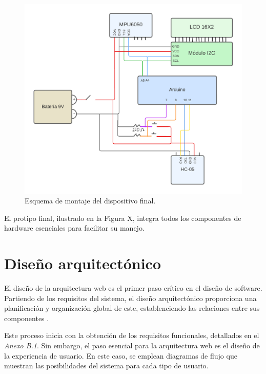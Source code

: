 \begin{figure}[h]
    \centering
    \includegraphics[width=1\textwidth]{img/E1_Planos/EsquemaArduino.png}
    \caption{Esquema de montaje del dispositivo final.}
    \label{fig:arqFinal}
\end{figure}

El protipo final, ilustrado en la Figura X, integra todos los componentes de hardware esenciales para facilitar su manejo.


\section{Diseño arquitectónico}
El diseño de la arquitectura web es el primer paso crítico en el diseño de software. Partiendo de los requisitos del sistema, el diseño arquitectónico proporciona una planificación y organización global de este, establenciendo las relaciones entre sus componentes \cite{castro2015arquitectura}.

Este proceso inicia con la obtención de los requisitos funcionales, detallados en el \textit{Anexo B.1}. Sin embargo, el paso esencial para la arquitectura web es el diseño de la experiencia de usuario. En este caso, se emplean diagramas de flujo que muestran las posibilidades del sistema para cada tipo de usuario.

